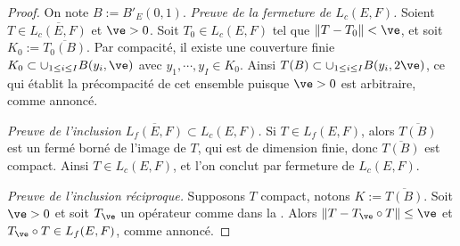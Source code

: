 \begin{proof}
	On note $B := B'_E(0,1)$. 
	\emph{Preuve de la fermeture de $L_c(E,F)$.} Soient $T \in \overline {L_c(E,F)}$ et $\ve>0$. Soit $T_0 \in L_c(E,F)$ tel que $\|T-T_0\|<\ve$, et soit $K_0 := \overline{T_0(B)}$. Par compacité, il existe une couverture finie $K_0 \subset \cup_{1 \leq i \leq I} B(y_i,\ve)$ avec $y_1,\cdots,y_I \in K_0$. Ainsi $T(B) \subset \cup_{1 \leq i \leq I} B(y_i,2\ve)$, ce qui établit la précompacité de cet ensemble puisque $\ve>0$ est arbitraire, comme annoncé. 
	
	
	\emph{Preuve de l'inclusion $\overline{L_f(E,F)} \subset L_c(E,F)$.}
	Si $T\in L_f(E,F)$, alors $\overline {T(B)}$ est un fermé borné de l'image de $T$, qui est de dimension finie, donc $\overline {T(B)}$ est compact. Ainsi $T \in L_c(E,F)$, et l'on conclut par fermeture de $L_c(E,F)$.
	
	\emph{Preuve de l'inclusion réciproque.}
	Supposons $T$ compact, notons $K := \overline{T(B)}$. Soit $\ve>0$ et soit $T_\ve$ un opérateur comme dans la . Alors $\|T-T_\ve \circ T\| \leq \ve$ et $T_\ve \circ T \in L_f(E,F)$, comme annoncé. 
	
\end{proof}
